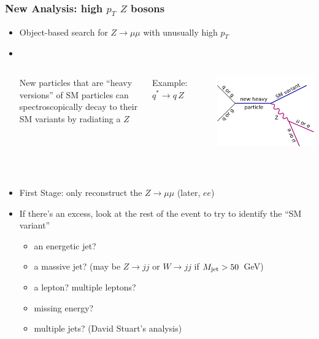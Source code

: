\documentclass[compress]{beamer}
\begin{document}
\begin{frame}
\frametitle{New Analysis: high $p_T$ $Z$ bosons}
\begin{itemize}\setlength{\itemsep}{0.1 cm}
\item Object-based search for $Z\to\mu\mu$ with unusually high $p_T$
\item \mbox{ }

\vspace{-0.8 cm}
\begin{columns}

New particles that are ``heavy versions'' of SM particles can spectroscopically decay to their SM variants by radiating a $Z$

\vspace{0.2 cm}
Example: $q^* \to q \, Z$

\mbox{ }

\includegraphics[width=\linewidth]{diagram.png}
\end{columns}

\vspace{-0.8 cm}
\mbox{ }

\item First Stage: only reconstruct the $Z\to\mu\mu$ (later, $ee$)

\item If there's an excess, look at the rest of the event to try to identify the ``SM variant''

\begin{itemize}
\item an energetic jet?
\item a massive jet? (may be $Z\to j j$ or $W\to j j$ if $M_{\mbox{\scriptsize jet}} > 50$~GeV)
\item a lepton?  multiple leptons?
\item missing energy?
\item multiple jets? (David Stuart's analysis)
\end{itemize}


\end{itemize}
\end{frame}
\end{document}
